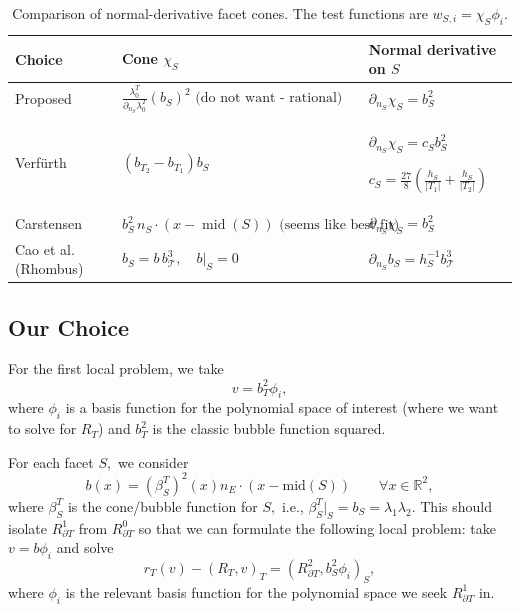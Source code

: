 \documentclass[12pt,a4paper]{article}
\begin{document}
\begin{table}[ht]
\centering
\small
\renewcommand{\arraystretch}{2}

\begin{tabular}{|l|p{}|p{}|}
\hline
\textbf{Choice} &
\textbf{Cone $\chi_S$} &
\textbf{Normal derivative on $S$} \\
\hline

Proposed &
$\displaystyle
\frac{\lambda_0^T}
{\partial_{n_S}\lambda_0^T}
(b_S)^2 \text{ (do not want - rational) }
$ &
$\displaystyle
\partial_{n_S}\chi_S
 = b_S^2$ \\
\hline

Verf\"urth &
$\displaystyle
(b_{T_2}-b_{T_1})b_S
$ &
$\displaystyle
\partial_{n_S}\chi_S=c_S b_S^2
$

$\displaystyle
c_S=\frac{27}{8}
\left(\frac{h_S}{|T_1|}+
\frac{h_S}{|T_2|}\right)
$ \\
\hline

Carstensen &
$\displaystyle
b_S^2\,
n_S\cdot(x-\operatorname{mid}(S)) 
 \text{ (seems like best fit) } $&
$\displaystyle
\partial_{n_S}\chi_S=b_S^2
$ \\
\hline

Cao et al. (Rhombus) &
$\displaystyle
b_S=b\,b_{\mathcal T}^{3},
\quad b|_S=0 
$ &
$\displaystyle
\partial_{n_S}b_S
=h_S^{-1}b_{\mathcal T}^{3} 
$ \\
\hline


\end{tabular}

\caption{Comparison of normal-derivative facet cones.
The test functions are $w_{S,i}=\chi_S\phi_i$.}
\end{table}


\subsection{Our Choice}

For the first local problem, we take 
\begin{equation}
    v = b_T^2 \phi_i,
\end{equation}
where $\phi_i$ is a basis function for the polynomial space of interest (where we want to solve for $R_T$) and $b_T^2$ is the classic bubble function squared.  

For each facet $S,$ we consider
\begin{equation}
    b(x) = (\beta_S^T)^2(x) n_E \cdot (x - \text{mid}(S))  \qquad \forall x \in \mathbb{R}^2,
\end{equation}
where $\beta_S^T$ is the cone/bubble function for $S,$ i.e., $\beta_S^T |_S = b_S = \lambda_1 \lambda_2.$ This should isolate $R_{\partial T}^1$ from $R_{\partial T}^0$ so that we can formulate the following local problem: take $v = b\phi_i$ and solve
\begin{equation}
    r_T(v) - (R_T, v)_T = (R_{\partial T}^2, b_S^2 \phi_i)_S,
\end{equation}
where $\phi_i$ is the relevant basis function for the polynomial space we seek $R_{\partial T}^1$ in. 
\end{document}
